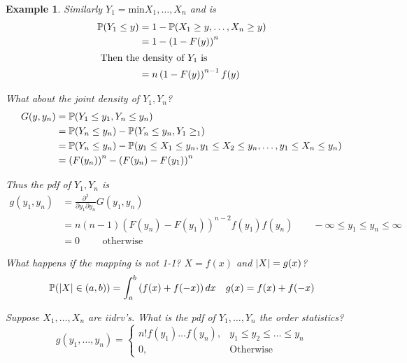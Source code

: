 \documentclass{notes}
\theoremstyle{plain}
\newtheorem*{example}{Example}
\newcommand{\bP}{\mathbb{P}}
\newcommand{\prob}[1]{\bP \negthinspace\left(#1\right)}
\begin{document}
\begin{example}
Similarly $Y_1 = \text{min}{X_1,\dots,X_n}$ and is 
\begin{align*}
\prob{Y_1 \leq y} &= 1- \prob{ X_1 \ge y,\dots, X_n \ge y}\\
&= 1 - \left( 1- F(y) \right)^n\\
\intertext{ Then the density of $Y_1$ is}
&= n \left( 1- F(y) \right)^{n-1}f(y)
\end{align*}

What about the joint density of $ Y_1,Y_n$?
\begin{align*}
G(y,y_n) &= \prob{Y_1 \leq y_1, Y_n \leq y_n}\\
&= \prob{Y_n \leq y_n} - \prob{Y_n \leq y_n, Y_1 \ge _1}\\
&=  \prob{Y_n \leq y_n} - \prob{y_1 \leq X_1 \leq y_n, y_1 \leq X_2
  \leq y_n,\dots,  y_1 \leq X_n \leq y_n}\\
&=  \left(F(y_n)\right)^n - \left(F(y_n) - F(y_1) \right)^n
\end{align*}

Thus the pdf of $Y_1,Y_n$ is 
\begin{align*}
g(y_1,y_n) & = \frac{\partial^2}{\partial y_1\partial y_n}
G(y_1,y_n)\\
&= n(n-1) \left(F(y_n) - F(y_1) \right)^{n-2}f(y_1)f(y_n) \qquad -\infty
\le y_1 \leq y_n \le \infty\\
&= 0 \qquad \text{ otherwise}
\end{align*}

What happens if the mapping is not 1-1? $X = f(x)$ and $\left|X\right| = g(x)$?
\[
\prob{\abs{X}\in (a,b)} = \int_{a}^{b}\left(f(x) +f(-x) \right)dx \quad
g(x) = f(x) +  f(-x)
\]

Suppose $X_1,\dots,X_n$ are iidrv's. What is the pdf of
$Y_1,\dots,Y_n$ the order statistics?
\begin{equation}
g(y_1,\dots,y_n) = 
\begin{cases}
n!f(y_1)\dots f(y_n), & y_1\le y_2 \le \dots \le y_n\\
0, &\text{Otherwise}
\end{cases}
\end{equation}
\end{example}
\end{document}
